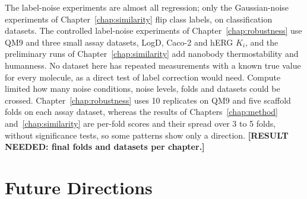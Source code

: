The label-noise experiments are almost all regression; only the Gaussian-noise experiments of Chapter~\ref{chap:similarity} flip class labels, on classification datasets. %
The controlled label-noise experiments of Chapter~\ref{chap:robustness} use QM9 and three small assay datasets, LogD, Caco-2 and hERG $K_i$, and the preliminary runs of Chapter~\ref{chap:similarity} add nanobody thermostability and humanness. No dataset here has repeated measurements with a known true value for every molecule, as a direct test of label correction would need. Compute limited how many noise conditions, noise levels, folds and datasets could be crossed. Chapter~\ref{chap:robustness} uses 10 replicates on QM9 and five scaffold folds on each assay dataset, whereas the results of Chapters~\ref{chap:method} and~\ref{chap:similarity} are per-fold scores and their spread over 3 to 5 folds, without significance tests, so some patterns show only a direction. \textbf{[RESULT NEEDED: final folds and datasets per chapter.]}



\section{Future Directions}

